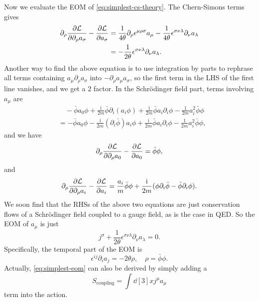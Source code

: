 \documentclass[hyperref, a4paper]{article}
\newcommand*{\ii}{\mathrm{i}}
\begin{document}
Now we evaluate the EOM of \eqref{eq:simplest-cs-theory}. The Chern-Simons terms gives 
\[
    \begin{aligned}
        \partial_\rho \pdv{\mathcal{L}}{\partial_\rho a_\sigma} - \pdv{\mathcal{L}}{a_\sigma} &= 
        \frac{1}{4 \theta} \partial_\rho \epsilon^{\mu \rho \sigma} a_\mu - \frac{1}{4\theta} \epsilon^{\sigma \nu \lambda} \partial_\nu a_\lambda \\
        &= -  \frac{1}{2 \theta} \epsilon^{\sigma \nu \lambda} \partial_\nu a_\lambda.
    \end{aligned}
\]
Another way to find the above equation is to use integration by parts to rephrase all terms 
containing $a_\mu \partial_\rho a_\sigma$ into $- \partial_\rho a_\mu a_\sigma$, so the first term in the 
LHS of the first line vanishes, and we get a $2$ factor.
In the Schrödinger field part, terms involving $a_\mu$ are 
\[
    \begin{aligned}
        &\quad - \bar{\phi} a_0 \phi + \frac{\ii}{2m} \bar{\phi} \partial_i (a_i \phi) 
        + \frac{\ii}{2m} \bar{\phi} a_i \partial_i \phi - \frac{1}{2m} a_i^2 \bar{\phi} \phi \\
        &= - \bar{\phi} a_0 \phi - \frac{\ii}{2m} (\partial_i \bar{\phi}) a_i \phi 
        + \frac{\ii}{2m} \bar{\phi} a_i \partial_i \phi - \frac{1}{2m} a_i^2 \bar{\phi} \phi  ,
    \end{aligned}
\]
and we have 
\[
    \partial_\rho \pdv{\mathcal{L}}{\partial_\rho a_0} - \pdv{\mathcal{L}}{a_0} = \bar{\phi} \phi,
\]
and 
\[
    \partial_\rho \pdv{\mathcal{L}}{\partial_\rho a_i} - \pdv{\mathcal{L}}{a_i} 
    = \frac{a_i}{m} \bar{\phi} \phi + \frac{\ii}{2m} (\phi \partial_i \bar{\phi} - \bar{\phi} \partial_i \phi).
\]
We soon find that the RHSs of the above two equations are just conservation flows of a Schrödinger field 
coupled to a gauge field, as is the case in QED. So the EOM of $a_\mu$ is just 
\begin{equation}
    j^\sigma + \frac{1}{2 \theta} \epsilon^{\sigma \nu \lambda} \partial_\nu a_\lambda = 0.
    \label{eq:simplest-eom}
\end{equation} 
Specifically, the temporal part of the EOM is 
\begin{equation}
    \epsilon^{i j} \partial_{i} a_{j} = - 2 \theta \rho, \quad \rho = \bar{\phi} \phi.
\end{equation}
Actually, \eqref{eq:simplest-eom} can also be derived by simply adding a 
\begin{equation}
    S_\text{coupling} = \int \dd[3]{x} j^\mu a_\mu
\end{equation}
term into the action. 
\end{document}
